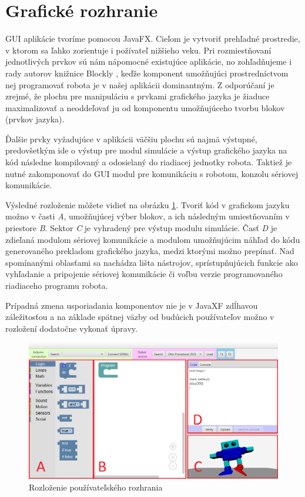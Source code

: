 \section{Grafické rozhranie}
GUI aplikácie tvoríme pomocou JavaFX. Cieľom je vytvoriť prehľadné prostredie, v ktorom sa ľahko zorientuje i požívateľ nižšieho veku. Pri rozmiestňovaní jednotlivých prvkov sú nám nápomocné existujúce aplikácie, no zohľadňujeme i rady autorov knižnice Blockly \cite{blocklyBestPractices}, keďže komponent umožňujúci prostredníctvom nej programovať robota je v našej aplikácii dominantným. Z odporúčaní je zrejmé, že plochu pre manipuláciu s prvkami grafického jazyka je žiaduce maximalizovať a neoddeľovať ju od komponentu umožňujúceho tvorbu blokov (prvkov jazyka).

Ďalšie prvky vyžadujúce v aplikácii väčšiu plochu sú najmä výstupné, predovšetkým ide o výstup pre modul simulácie a výstup  grafického jazyka na kód následne kompilovaný a odosielaný do riadiacej jednotky robota. Taktiež je nutné zakomponovať do GUI modul pre komunikáciu s robotom, konzolu sériovej komunikácie.

Výsledné rozloženie môžete vidieť na obrázku \ref{obr:gui-layout}. Tvoriť kód v grafickom jazyku možno v časti \textit{A}, umožňujúcej výber blokov, a ich následným umiestňovaním v priestore \textit{B}. Sektor \textit{C} je vyhradený pre výstup modulu simulácie. Časť \textit{D} je zdieľaná modulom sériovej komunikácie a modulom umožňujúcim náhľad do kódu generovaného prekladom grafického jazyka, medzi ktorými možno prepínať. Nad spomínanými oblasťami sa nachádza lišta nástrojov, sprístupňujúcich funkcie ako vyhľadanie a pripojenie sériovej komunikácie či voľbu verzie programovaného riadiaceho programu robota.

Prípadná zmena usporiadania komponentov nie je v JavaXF zdĺhavou záležitosťou a na základe spätnej väzby od budúcich používateľov možno v rozložení dodatočne vykonať úpravy.

\begin{figure}
\centerline{\includegraphics[width=1\textwidth]{images/rozlozenie-gui}}
\caption[Rozloženie používateľského rozhrania]{Rozloženie používateľského rozhrania}
\label{obr:gui-layout}
\end{figure}


